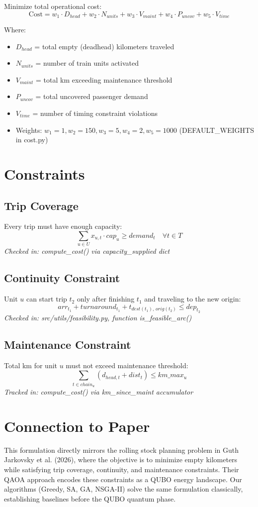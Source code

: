 \documentclass{article}
\begin{document}
Minimize total operational cost:
\[
  \text{Cost} = w_1 \cdot D_{head} + w_2 \cdot N_{units} + w_3 \cdot V_{maint} + w_4 \cdot P_{uncov} + w_5 \cdot V_{time}
\]

Where:
\begin{itemize}
  \item $D_{head}$ = total empty (deadhead) kilometers traveled
  \item $N_{units}$ = number of train units activated
  \item $V_{maint}$ = total km exceeding maintenance threshold
  \item $P_{uncov}$ = total uncovered passenger demand
  \item $V_{time}$ = number of timing constraint violations
  \item Weights: $w_1=1, w_2=150, w_3=5, w_4=2, w_5=1000$ (DEFAULT\_WEIGHTS in cost.py)
\end{itemize}

\section{Constraints}

\subsection{Trip Coverage}
Every trip must have enough capacity:
\[
  \sum_{u \in U} x_{u,t} \cdot cap_u \geq demand_t \quad \forall t \in T
\]
\textit{Checked in: compute\_cost() via capacity\_supplied dict}

\subsection{Continuity Constraint}
Unit $u$ can start trip $t_2$ only after finishing $t_1$ and traveling to the new origin:
\[
  arr_{t_1} + turnaround_{t_1} + t_{dest(t_1),\, orig(t_2)} \leq dep_{t_2}
\]
\textit{Checked in: src/utils/feasibility.py, function is\_feasible\_arc()}

\subsection{Maintenance Constraint}
Total km for unit $u$ must not exceed maintenance threshold:
\[
  \sum_{t \in chain_u} (d_{head,t} + dist_t) \leq km\_max_u
\]
\textit{Tracked in: compute\_cost() via km\_since\_maint accumulator}

\section{Connection to Paper}
This formulation directly mirrors the rolling stock planning problem in
Guth Jarkovsky et al. (2026), where the objective is to minimize empty kilometers
while satisfying trip coverage, continuity, and maintenance constraints.
Their QAOA approach encodes these constraints as a QUBO energy landscape.
Our algorithms (Greedy, SA, GA, NSGA-II) solve the same formulation classically,
establishing baselines before the QUBO quantum phase.
\end{document}
